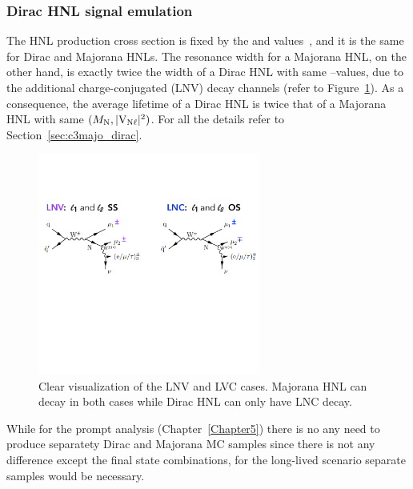 \subsubsection{Dirac HNL signal emulation}\label{sec:c4diracmajo}
The HNL production cross section is fixed by the \mhnl and \mixpar
values~\cite{Degrande_2016,heavyN}, and it is the same for Dirac and
Majorana HNLs.
The resonance width for a Majorana HNL, on the other hand, is exactly
twice the width of a Dirac HNL with same \mhnl--\mixpar values, due to
the additional charge-conjugated (LNV) decay channels (refer to Figure~\ref{fig:dirac_majo}).
As a consequence, the average lifetime of a Dirac HNL is twice that of
a Majorana HNL with same $(M_{\mathrm{N}},\mathrm{|V_{\mathrm{N}\ell}|^2})$. For all the details refer
to Section~\ref{sec:c3majo_dirac}.
\begin{figure}[h!]
\centering
 \includegraphics[clip,trim=0cm 7cm 0cm 3cm, width=0.65\textwidth]{Figures/c4/dirac_majo2}
  \caption{Clear visualization of the LNV and LVC cases. Majorana HNL
    can decay in both cases while Dirac HNL can only have LNC decay.}
  \label{fig:dirac_majo}
\end{figure}

While for the prompt analysis (Chapter~\ref{Chapter5}) there is no any
need to produce separatety Dirac and Majorana MC samples since there is
not any difference except the final state combinations, for the
long-lived scenario separate samples would be necessary.

